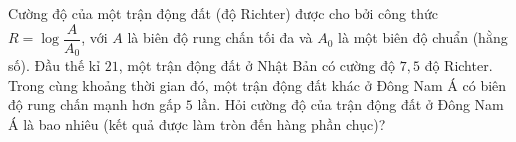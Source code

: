 \begin{bt}%

	Cường độ của một trận động đất (độ Richter) được cho bởi công thức
	$R = \log \dfrac{A}{A_0}$,
	với $A$ là biên độ rung chấn tối đa và $A_0$ là một biên độ chuẩn (hằng số). 	
	Đầu thế kỉ $21$, một trận động đất ở Nhật Bản có cường độ $7{,}5$ độ Richter. Trong cùng khoảng thời gian đó, một trận động đất khác ở Đông Nam Á có biên độ rung chấn mạnh hơn gấp $5$ lần. Hỏi cường độ của trận động đất ở Đông Nam Á là bao nhiêu (kết quả được làm tròn đến hàng phần chục)?
	
\end{bt}


